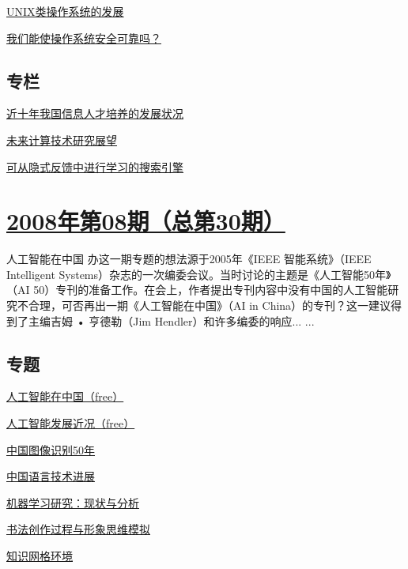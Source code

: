 \documentclass[a4paper]{article}
\begin{document}
\href{http://history.ccf.org.cn/resources/1190201776262/2010/04/15/031050.pdf}{UNIX类操作系统的发展}

\href{http://history.ccf.org.cn/resources/1190201776262/2010/04/15/031060.pdf}{我们能使操作系统安全可靠吗？}

\subsection{专栏}
\href{http://history.ccf.org.cn/resources/1190201776262/2010/04/15/031070.pdf}{近十年我国信息人才培养的发展状况}

\href{http://history.ccf.org.cn/resources/1190201776262/2010/04/15/031072.pdf}{未来计算技术研究展望}

\href{http://history.ccf.org.cn/resources/1190201776262/2010/04/15/031076.pdf}{可从隐式反馈中进行学习的搜索引擎}


\section{\href{http://history.ccf.org.cn/sites/ccf/jsjtbbd.jsp?contentId=2542567629007}{\textbf{2008年第08期（总第30期）}}}
人工智能在中国 办这一期专题的想法源于2005年《IEEE 智能系统》（IEEE Intelligent Systems）杂志的一次编委会议。当时讨论的主题是《人工智能50年》（AI 50）专刊的准备工作。在会上，作者提出专刊内容中没有中国的人工智能研究不合理，可否再出一期《人工智能在中国》（AI in China）的专刊？这一建议得到了主编吉姆 • 亨德勒（Jim Hendler）和许多编委的响应... ...
\subsection{专题}
\href{http://history.ccf.org.cn/resources/1190201776262/2010/04/15/030012.pdf}{人工智能在中国（free）}

\href{http://history.ccf.org.cn/resources/1190201776262/2010/04/15/030015.pdf}{人工智能发展近况（free）}

\href{http://history.ccf.org.cn/resources/1190201776262/2010/04/15/030028.pdf}{中国图像识别50年}

\href{http://history.ccf.org.cn/resources/1190201776262/2010/04/15/030039.pdf}{中国语言技术进展}

\href{http://history.ccf.org.cn/resources/1190201776262/2010/04/15/030049.pdf}{机器学习研究：现状与分析}

\href{http://history.ccf.org.cn/resources/1190201776262/2013/09/29/030057.pdf}{书法创作过程与形象思维模拟}

\href{http://history.ccf.org.cn/resources/1190201776262/2010/04/15/030064.pdf}{知识网格环境}
\end{document}
